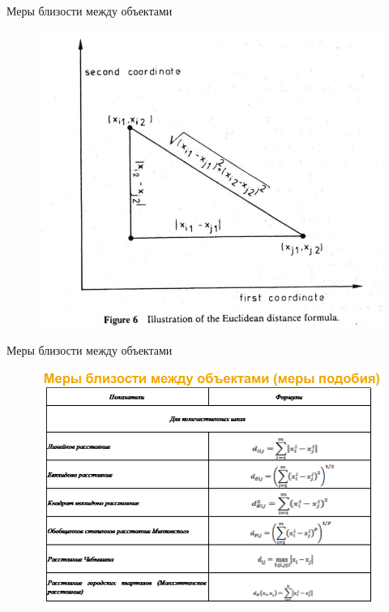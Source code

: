 \documentclass{beamer}
\begin{document}
\begin{frame}{Меры близости между объектами}
\begin{figure}[h]
\centering
\includegraphics[scale=0.4]{images/lec07-pic08.png}
\end{figure}
\end{frame}

\begin{frame}{Меры близости между объектами}
\begin{figure}[h]
\centering
\includegraphics[scale=0.4]{images/lec07-pic09.png}
\end{figure}
\end{frame}
\end{document}
